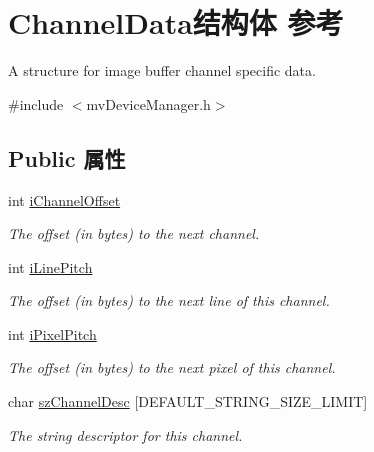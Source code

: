 \hypertarget{struct_channel_data}{\section{Channel\+Data结构体 参考}
\label{struct_channel_data}
}


A structure for image buffer channel specific data.  




{\ttfamily \#include $<$mv\+Device\+Manager.\+h$>$}

\subsection*{Public 属性}
\begin{DoxyCompactItemize}
\item 
\hypertarget{struct_channel_data_a21c7478dc819c48236e9f3d08bfb9dd3}{int \hyperlink{struct_channel_data_a21c7478dc819c48236e9f3d08bfb9dd3}{i\+Channel\+Offset}}\label{struct_channel_data_a21c7478dc819c48236e9f3d08bfb9dd3}

\begin{DoxyCompactList}\small\item\em The offset (in bytes) to the next channel. \end{DoxyCompactList}\item 
\hypertarget{struct_channel_data_a7d146307f0641ef506e5588a2edcfd77}{int \hyperlink{struct_channel_data_a7d146307f0641ef506e5588a2edcfd77}{i\+Line\+Pitch}}\label{struct_channel_data_a7d146307f0641ef506e5588a2edcfd77}

\begin{DoxyCompactList}\small\item\em The offset (in bytes) to the next line of this channel. \end{DoxyCompactList}\item 
\hypertarget{struct_channel_data_a3435222e4fe3c4ea06b7bfbfde1a0cb5}{int \hyperlink{struct_channel_data_a3435222e4fe3c4ea06b7bfbfde1a0cb5}{i\+Pixel\+Pitch}}\label{struct_channel_data_a3435222e4fe3c4ea06b7bfbfde1a0cb5}

\begin{DoxyCompactList}\small\item\em The offset (in bytes) to the next pixel of this channel. \end{DoxyCompactList}\item 
char \hyperlink{struct_channel_data_ad67b0964b56b1af796428b3fe3f2f735}{sz\+Channel\+Desc} \mbox{[}D\+E\+F\+A\+U\+L\+T\+\_\+\+S\+T\+R\+I\+N\+G\+\_\+\+S\+I\+Z\+E\+\_\+\+L\+I\+M\+I\+T\mbox{]}
\begin{DoxyCompactList}\small\item\em The string descriptor for this channel. \end{DoxyCompactList}\end{DoxyCompactItemize}



